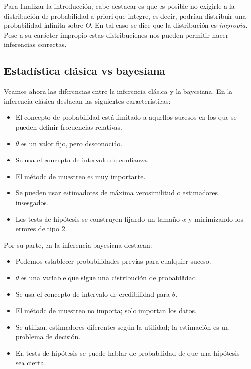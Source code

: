 \documentclass{article}
\begin{document}
Para finalizar la introducción, cabe destacar es que es posible no exigirle a la distribución de probabilidad a priori que integre, es decir, podrían distribuir una probabilidad infinita sobre $\Theta$. En tal caso se dice que la distribución es \textit{impropia}. Pese a su carácter impropio estas distribuciones nos pueden permitir hacer inferencias correctas.

\subsection{Estadística clásica vs bayesiana}

Veamos ahora las diferencias entre la inferencia clásica y la bayesiana. En la inferencia clásica destacan las siguientes características:

\begin{itemize}
	\item El concepto de probabilidad está limitado a aquellos sucesos en los que se pueden definir frecuencias relativas.
	\item $\theta$ es un valor fijo, pero desconocido.
	\item Se usa el concepto de intervalo de confianza.%
	\item El método de muestreo es muy importante.
	\item Se pueden usar estimadores de máxima verosimilitud o estimadores insesgados.
    \item Los tests de hipótesis se construyen fijando un tamaño $\alpha$ y minimizando los errores de tipo 2.
\end{itemize}

Por su parte, en la inferencia bayesiana destacan:

\begin{itemize}
	\item Podemos establecer probabilidades previas para cualquier suceso.
	\item $\theta$ es una variable que sigue una distribución de probabilidad.
	\item Se usa el concepto de intervalo de credibilidad para $\theta$.%
	\item El método de muestreo no importa; solo importan los datos.
	\item Se utilizan estimadores diferentes según la utilidad; la estimación es un problema de decisión.
    \item En tests de hipótesis se puede hablar de probabilidad de que una hipótesis sea cierta.
\end{itemize}
\end{document}
